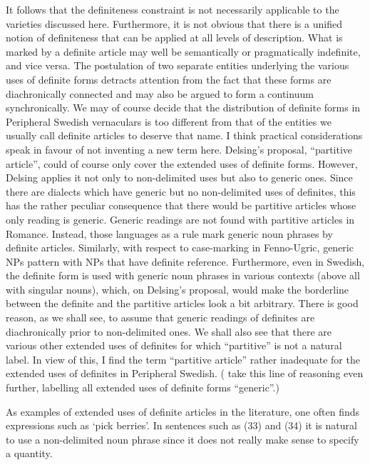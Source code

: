 It follows that the definiteness constraint is not necessarily applicable to the varieties discussed here. Furthermore, it is not obvious that there is a unified notion of definiteness that can be applied at all levels of description. What is marked by a definite article may well be semantically or pragmatically indefinite, and vice versa. The postulation of two separate entities underlying the various uses of definite forms detracts attention from the fact that these forms are diachronically connected and may also be argued to form a continuum synchronically. We may of course decide that the distribution of definite forms in Peripheral Swedish vernaculars is too different from that of the entities we usually call definite articles to deserve that name. I think practical considerations speak in favour of not inventing a new term here. Delsing’s proposal, “partitive article”, could of course only cover the extended uses of definite forms. However, Delsing applies it not only to non-delimited uses but also to generic ones. Since there are dialects which have generic but no non-delimited uses of definites, this has the rather peculiar consequence that there would be partitive articles whose only reading is generic. Generic readings are not found with partitive articles in Romance. Instead, those languages as a rule mark generic noun phrases by definite articles. Similarly, with respect to case-marking in Fenno-Ugric, generic NPs pattern with NPs that have definite reference. Furthermore, even in Swedish, the definite form is used with generic noun phrases in various contexts (above all with singular nouns), which, on Delsing’s proposal, would make the borderline between the definite and the partitive articles look a bit arbitrary. There is good reason, as we shall see, to assume that generic readings of definites are diachronically prior to non-delimited ones. We shall also see that there are various other extended uses of definites for which “partitive” is not a natural label. In view of this, I find the term “partitive article” rather inadequate for the extended uses of definites in Peripheral Swedish. (\citet{BergholmEtAl1999} take this line of reasoning even further, labelling all extended uses of definite forms “generic”.)


As examples of extended uses of definite articles in the literature, one often finds expressions such as ‘pick berries’. In sentences such as (33) and (34) it is natural to use a non-delimited noun phrase since it does not really make sense to specify a quantity. 

